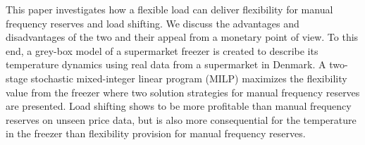 
This paper investigates how a flexible load can deliver flexibility for manual frequency reserves and load shifting. We discuss the advantages and disadvantages of the two and their appeal from a monetary point of view. To this end, a grey-box model of a supermarket freezer is created to describe its temperature dynamics using real data from a supermarket in Denmark. A two-stage stochastic mixed-integer linear program (MILP) maximizes the flexibility value from the freezer where two solution strategies for manual frequency reserves are presented. Load shifting shows to be more profitable than manual frequency reserves on unseen price data, but is also more consequential for the temperature in the freezer than flexibility provision for manual frequency reserves.
